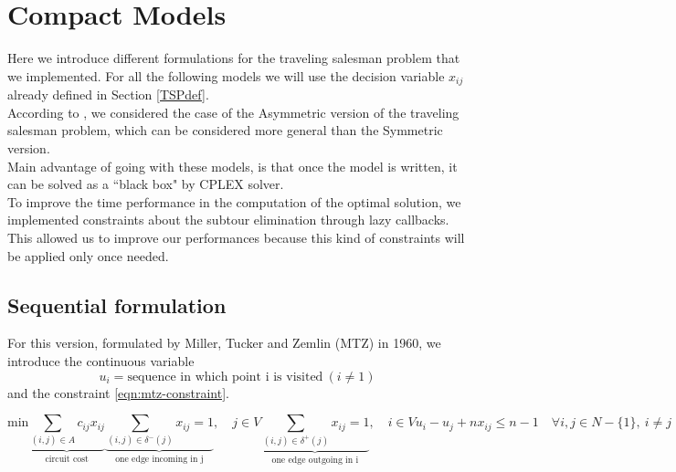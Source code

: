 \chapter{Compact Models}
Here we introduce different formulations for the traveling salesman problem that we implemented. For all the following models we will use the decision variable $x_{ij}$ already defined in Section \ref{TSPdef}.\\
According to \cite{ormanWilliams}, we considered the case of the Asymmetric version of the traveling salesman problem, which can be considered more general than the Symmetric version.\\
Main advantage of going with these models, is that once the model is written, it can be solved as a ``black box" by CPLEX solver.\\
To improve the time performance in the computation of the optimal solution, we implemented constraints about the subtour elimination through lazy callbacks. This allowed us to improve our performances because this kind of constraints will be applied only once needed.

\section{Sequential formulation}
For this version, formulated by Miller, Tucker and Zemlin (MTZ) in 1960, we introduce the continuous variable 
\begin{equation*}
	u_i = \text{sequence in which point i is visited} \ (i \neq 1)
\end{equation*}
and the constraint \ref{eqn:mtz-constraint}.

\begin{subequations}
	\begin{equation}
		\text{min} \underbrace{\sum_{(i,j) \in A} c_{ij}x_{ij}}_\text{circuit cost}
	\end{equation}
	\begin{equation}
		\underbrace{\sum_{(i,j) \in \delta^{-}(j)} x_{ij} = 1}_\text{one edge incoming in j}, \quad j \in V 
		\label{eqn:2.1b}
	\end{equation}
	\begin{equation}
		\underbrace{\sum_{(i,j) \in \delta^{+}(j)} x_{ij} = 1}_\text{one edge outgoing in i}, \quad i \in V
		\label{eqn:2.1c}
	\end{equation}
	\begin{equation}
		u_i-u_j+nx_{ij} \leq n-1 \quad \forall i,j \in N-\lbrace 1 \rbrace, \ i\neq j
		\label{eqn:mtz-constraint}
	\end{equation}
\end{subequations}


